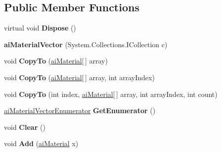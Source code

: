 \subsection*{Public Member Functions}
\begin{DoxyCompactItemize}
\item 
\hypertarget{classai_material_vector_a56559ee05e61ccca1f31468f4c86bf00}{virtual void {\bfseries Dispose} ()}\label{classai_material_vector_a56559ee05e61ccca1f31468f4c86bf00}

\item 
\hypertarget{classai_material_vector_a8291d220cd5aae502db3fa29091c3232}{{\bfseries ai\+Material\+Vector} (System.\+Collections.\+I\+Collection c)}\label{classai_material_vector_a8291d220cd5aae502db3fa29091c3232}

\item 
\hypertarget{classai_material_vector_abad1db5bea6ee71fcf2e959de2b00e35}{void {\bfseries Copy\+To} (\hyperlink{classai_material}{ai\+Material}\mbox{[}$\,$\mbox{]} array)}\label{classai_material_vector_abad1db5bea6ee71fcf2e959de2b00e35}

\item 
\hypertarget{classai_material_vector_a7c723c1269fa4419ca456faacb4a2d0e}{void {\bfseries Copy\+To} (\hyperlink{classai_material}{ai\+Material}\mbox{[}$\,$\mbox{]} array, int array\+Index)}\label{classai_material_vector_a7c723c1269fa4419ca456faacb4a2d0e}

\item 
\hypertarget{classai_material_vector_a5389bc8a8e9d51db83045e2e20d85b0a}{void {\bfseries Copy\+To} (int index, \hyperlink{classai_material}{ai\+Material}\mbox{[}$\,$\mbox{]} array, int array\+Index, int count)}\label{classai_material_vector_a5389bc8a8e9d51db83045e2e20d85b0a}

\item 
\hypertarget{classai_material_vector_a721fe8caf91e72a842e7374c17669fc8}{\hyperlink{classai_material_vector_1_1ai_material_vector_enumerator}{ai\+Material\+Vector\+Enumerator} {\bfseries Get\+Enumerator} ()}\label{classai_material_vector_a721fe8caf91e72a842e7374c17669fc8}

\item 
\hypertarget{classai_material_vector_a165a5525c197f6091023bb3bae5b622d}{void {\bfseries Clear} ()}\label{classai_material_vector_a165a5525c197f6091023bb3bae5b622d}

\item 
\hypertarget{classai_material_vector_adda1376aed5428809534a362fc6c7392}{void {\bfseries Add} (\hyperlink{classai_material}{ai\+Material} x)}\label{classai_material_vector_adda1376aed5428809534a362fc6c7392}


\end{DoxyCompactItemize}
